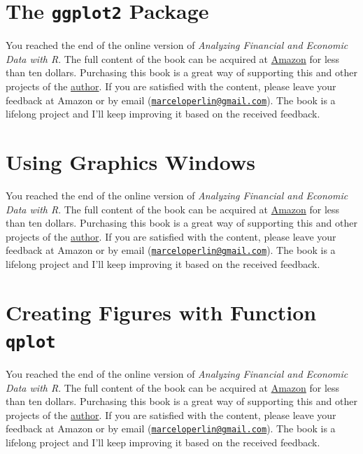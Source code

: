 \documentclass[
  12pt,
]{book}
\newenvironment{pleasebuyit}
{\begin{noteblock}
		
	} {\end{noteblock}}
\begin{document}
\hypertarget{the-ggplot2-package}{%
\section{\texorpdfstring{The \texttt{ggplot2} Package}{The ggplot2 Package}}\label{the-ggplot2-package}}

\begin{pleasebuyit}
You reached the end of the online version of \emph{Analyzing Financial
and Economic Data with R}. The full content of the book can be acquired
at \href{https://www.amazon.com/dp/B084LSNXMN}{Amazon} for less than ten
dollars. Purchasing this book is a great way of supporting this and
other projects of the \href{https://www.msperlin.com/blog/}{author}. If
you are satisfied with the content, please leave your feedback at Amazon
or by email
(\href{mailto:marceloperlin@gmail.com}{\nolinkurl{marceloperlin@gmail.com}}).
The book is a lifelong project and I'll keep improving it based on the
received feedback.
\end{pleasebuyit}

\hypertarget{using-graphics-windows}{%
\section{Using Graphics Windows}\label{using-graphics-windows}}

\begin{pleasebuyit}
You reached the end of the online version of \emph{Analyzing Financial
and Economic Data with R}. The full content of the book can be acquired
at \href{https://www.amazon.com/dp/B084LSNXMN}{Amazon} for less than ten
dollars. Purchasing this book is a great way of supporting this and
other projects of the \href{https://www.msperlin.com/blog/}{author}. If
you are satisfied with the content, please leave your feedback at Amazon
or by email
(\href{mailto:marceloperlin@gmail.com}{\nolinkurl{marceloperlin@gmail.com}}).
The book is a lifelong project and I'll keep improving it based on the
received feedback.
\end{pleasebuyit}

\hypertarget{creating-figures-with-function-qplot}{%
\section{\texorpdfstring{Creating Figures with Function \texttt{qplot}}{Creating Figures with Function qplot}}\label{creating-figures-with-function-qplot}}

\begin{pleasebuyit}
You reached the end of the online version of \emph{Analyzing Financial
and Economic Data with R}. The full content of the book can be acquired
at \href{https://www.amazon.com/dp/B084LSNXMN}{Amazon} for less than ten
dollars. Purchasing this book is a great way of supporting this and
other projects of the \href{https://www.msperlin.com/blog/}{author}. If
you are satisfied with the content, please leave your feedback at Amazon
or by email
(\href{mailto:marceloperlin@gmail.com}{\nolinkurl{marceloperlin@gmail.com}}).
The book is a lifelong project and I'll keep improving it based on the
received feedback.
\end{pleasebuyit}
\end{document}
